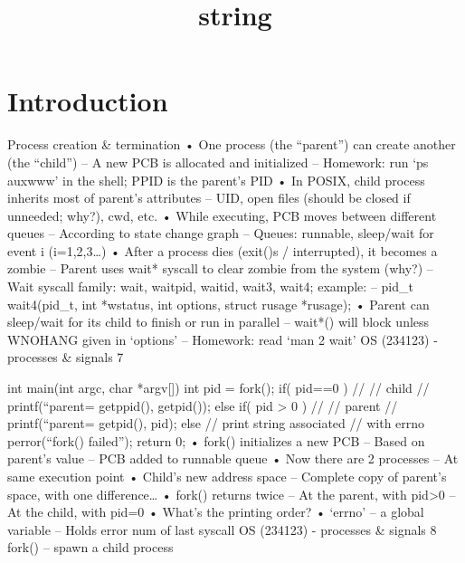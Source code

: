 \documentclass[12pt]{report}
\title{string}
\author{}
\begin{document}
\maketitle
\tableofcontents
\newpage

\section{Introduction}
Process creation & termination
• One process (the “parent”) can create another (the “child”)
– A new PCB is allocated and initialized
– Homework: run ‘ps auxwww’ in the shell; PPID is the parent’s PID
• In POSIX, child process inherits most of parent’s attributes
– UID, open files (should be closed if unneeded; why?), cwd, etc.
• While executing, PCB moves between different queues
– According to state change graph 
– Queues: runnable, sleep/wait for event i (i=1,2,3…)
• After a process dies (exit()s / interrupted), it becomes a zombie
– Parent uses wait* syscall to clear zombie from the system (why?)
– Wait syscall family: wait, waitpid, waitid, wait3, wait4; example:
– pid_t wait4(pid_t, int *wstatus, int options, struct rusage *rusage); 
• Parent can sleep/wait for its child to finish or run in parallel
– wait*() will block unless WNOHANG given in ‘options’
– Homework: read ‘man 2 wait’
OS (234123) - processes & signals
7

int main(int argc, char *argv[])
{
  int pid = fork();
  if( pid==0 ) { 
   //
   // child
      //
      printf(“parent=%
             getppid(), getpid());
  }
  else if( pid > 0 ) {
      //
      // parent
      //
      printf(“parent=%
             getpid(), pid);
  }
  else { // print string associated
         // with errno   
      perror(“fork() failed”); 
  }
  return 0;
}
• fork() initializes a new PCB
– Based on parent’s value
– PCB added to runnable queue
• Now there are 2 processes
– At same execution point
• Child’s new address space 
– Complete copy of parent’s 
space, with one difference…
• fork() returns twice
– At the parent, with pid>0
– At the child, with pid=0
• What’s the printing order?
• ‘errno’ – a global variable
– Holds error num of last syscall
OS (234123) - processes & signals
8
fork() – spawn a child process
\end{document}
